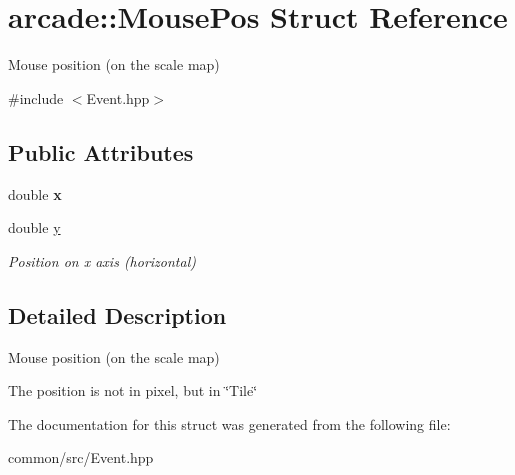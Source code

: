 \hypertarget{structarcade_1_1MousePos}{}\section{arcade\+:\+:Mouse\+Pos Struct Reference}
\label{structarcade_1_1MousePos}


Mouse position (on the scale map)  




{\ttfamily \#include $<$Event.\+hpp$>$}

\subsection*{Public Attributes}
\begin{DoxyCompactItemize}
\item 
\mbox{\label{structarcade_1_1MousePos_a0baa5eab2ede9028abdfa46dfbf3b901}} 
double {\bfseries x}
\item 
\mbox{\label{structarcade_1_1MousePos_a6737b813beae9a70aa6f7cbfc90154a6}} 
double \hyperlink{structarcade_1_1MousePos_a6737b813beae9a70aa6f7cbfc90154a6}{y}
\begin{DoxyCompactList}\small\item\em Position on x axis (horizontal) \end{DoxyCompactList}\end{DoxyCompactItemize}


\subsection{Detailed Description}
Mouse position (on the scale map) 

The position is not in pixel, but in \char`\"{}\+Tile\char`\"{} 

The documentation for this struct was generated from the following file\+:\begin{DoxyCompactItemize}
\item 
common/src/Event.\+hpp\end{DoxyCompactItemize}
